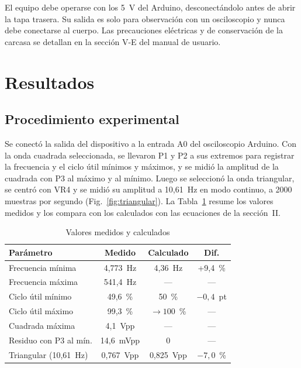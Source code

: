 \documentclass[conference]{IEEEtran}
\begin{document}
El equipo debe operarse con los 5~V del Arduino, desconectándolo antes de abrir la tapa trasera. Su salida es solo para observación con un osciloscopio y nunca debe conectarse al cuerpo. Las precauciones eléctricas y de conservación de la carcasa se detallan en la sección V-E del manual de usuario.

\section{Resultados}

\subsection{Procedimiento experimental}

Se conectó la salida del dispositivo a la entrada A0 del osciloscopio Arduino. Con la onda cuadrada seleccionada, se llevaron P1 y P2 a sus extremos para registrar la frecuencia y el ciclo útil mínimos y máximos, y se midió la amplitud de la cuadrada con P3 al máximo y al mínimo. Luego se seleccionó la onda triangular, se centró con VR4 y se midió su amplitud a 10,61~Hz en modo continuo, a 2000 muestras por segundo (Fig.~\ref{fig:triangular}). La Tabla~\ref{tab:resultados} resume los valores medidos y los compara con los calculados con las ecuaciones de la sección~II.

\begin{table}[!t]
\caption{Valores medidos y calculados}
\label{tab:resultados}
\centering
\begin{tabular}{>{\raggedright\arraybackslash}p{} c c c}
\hline
\textbf{Parámetro} & \textbf{Medido} & \textbf{Calculado} & \textbf{Dif.} \\
\hline
Frecuencia mínima & 4,773~Hz & 4,36~Hz & +9,4~\% \\
Frecuencia máxima & 541,4~Hz & --- & --- \\
Ciclo útil mínimo & 49,6~\% & 50~\% & $-0{,}4$~pt \\
Ciclo útil máximo & 99,3~\% & $\to 100$~\% & --- \\
Cuadrada máxima & 4,1~Vpp & --- & --- \\
Residuo con P3 al mín. & 14,6~mVpp & 0 & --- \\
Triangular (10,61~Hz) & 0,767~Vpp & 0,825~Vpp & $-7{,}0$~\% \\
\hline
\end{tabular}
\end{table}
\end{document}
